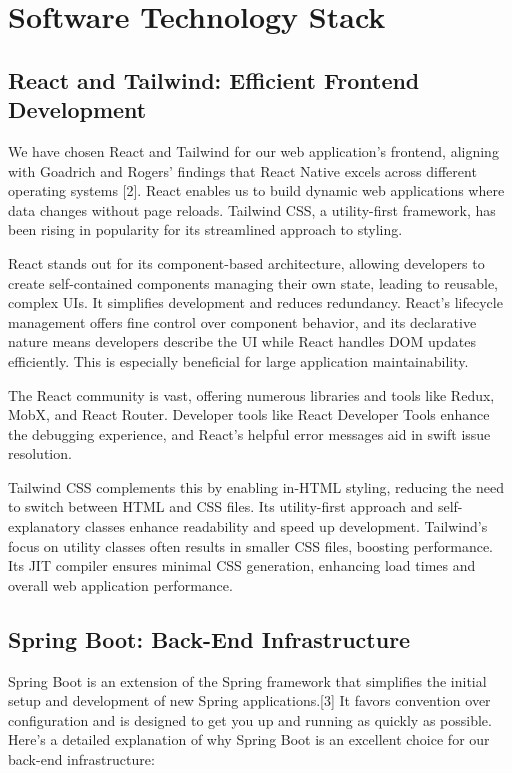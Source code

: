 \section{Software Technology Stack}
\label{sec:technology}

\subsection{React and Tailwind: Efficient Frontend Development}

We have chosen React and Tailwind for our web application's frontend, aligning with Goadrich and Rogers' findings that React Native excels across different operating systems [2]. React enables us to build dynamic web applications where data changes without page reloads. Tailwind CSS, a utility-first framework, has been rising in popularity for its streamlined approach to styling.

React stands out for its component-based architecture, allowing developers to create self-contained components managing their own state, leading to reusable, complex UIs. It simplifies development and reduces redundancy. React's lifecycle management offers fine control over component behavior, and its declarative nature means developers describe the UI while React handles DOM updates efficiently. This is especially beneficial for large application maintainability.

The React community is vast, offering numerous libraries and tools like Redux, MobX, and React Router. Developer tools like React Developer Tools enhance the debugging experience, and React's helpful error messages aid in swift issue resolution.

Tailwind CSS complements this by enabling in-HTML styling, reducing the need to switch between HTML and CSS files. Its utility-first approach and self-explanatory classes enhance readability and speed up development. Tailwind's focus on utility classes often results in smaller CSS files, boosting performance. Its JIT compiler ensures minimal CSS generation, enhancing load times and overall web application performance.

\subsection{Spring Boot: Back-End Infrastructure}
Spring Boot is an extension of the Spring framework that simplifies the initial setup and development of new Spring applications.[3] 
It favors convention over configuration and is designed to get you up and running as quickly as possible. Here's a detailed explanation of why Spring Boot is an excellent choice for our back-end infrastructure:

